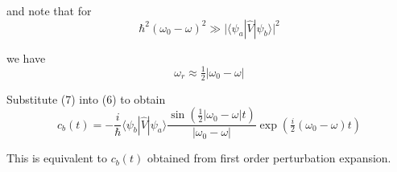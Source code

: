 and note that for
\begin{equation*}
\hbar^2(\omega_0-\omega)^2\gg\bigl|\langle\psi_a|\hat V|\psi_b\rangle\bigr|^2
\end{equation*}

we have
\begin{equation*}
\omega_r\approx\tfrac{1}{2}|\omega_0-\omega|
\tag{7}
\end{equation*}

Substitute (7) into (6) to obtain
\begin{equation*}
c_b(t)=-\frac{i}{\hbar}\langle\psi_b|\hat V|\psi_a\rangle
\frac{\sin\left(\tfrac{1}{2}|\omega_0-\omega|t\right)}{|\omega_0-\omega|}
\exp\left(\tfrac{i}{2}(\omega_0-\omega)t\right)
\end{equation*}

This is equivalent to $c_b(t)$ obtained from first order perturbation expansion.



